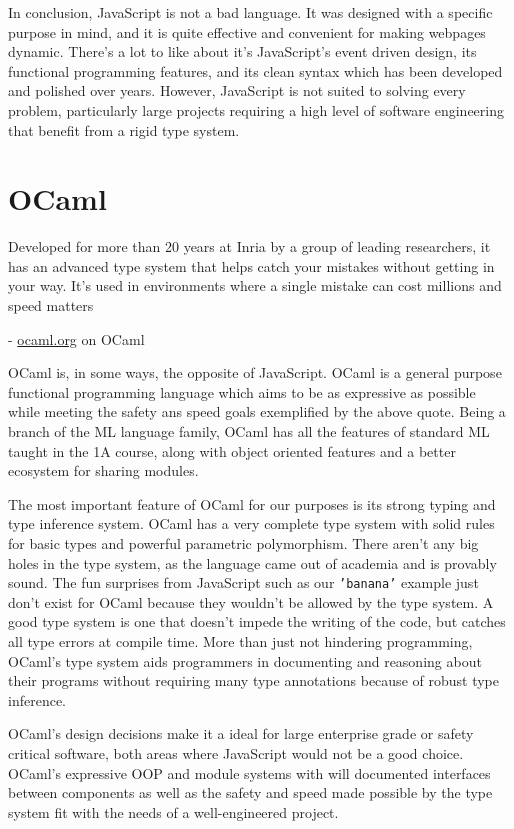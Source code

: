 \documentclass[12pt,a4paper,twoside,openright]{report}
\begin{document}
In conclusion, JavaScript is not a bad language.
It was designed with a specific purpose in mind, and it is quite effective and convenient for making webpages dynamic.
There's a lot to like about it's JavaScript's event driven design, its functional programming features, and its clean syntax which has been developed and polished over years.
However, JavaScript is not suited to solving every problem, particularly large projects requiring a high level of software engineering that benefit from a rigid type system.

\section{OCaml}
\epigraph{Developed for more than 20 years at Inria by a group of leading researchers, it has an advanced type system that helps catch your mistakes without getting in your way. It's used in environments where a single mistake can cost millions and speed matters}{- \url{ocaml.org} on OCaml}

OCaml is, in some ways, the opposite of JavaScript.
OCaml is a general purpose functional programming language which aims to be as expressive as possible while meeting the safety ans speed goals exemplified by the above quote.
Being a branch of the ML language family, OCaml has all the features of standard ML taught in the 1A course, along with object oriented features and a better ecosystem for sharing modules.

The most important feature of OCaml for our purposes is its strong typing and type inference system.
OCaml has a very complete type system with solid rules for basic types and powerful parametric polymorphism.
There aren't any big holes in the type system, as the language came out of academia and is provably sound.
The fun surprises from JavaScript such as our {\tt 'banana'} example just don't exist for OCaml because they wouldn't be allowed by the type system.
A good type system is one that doesn't impede the writing of the code, but catches all type errors at compile time.
More than just not hindering programming, OCaml's type system aids programmers in documenting and reasoning about their programs without requiring many type annotations because of robust type inference.

OCaml's design decisions make it a ideal for large enterprise grade or safety critical software, both areas where JavaScript would not be a good choice.
OCaml's expressive OOP and module systems with will documented interfaces between components as well as the safety and speed made possible by the type system fit with the needs of a well-engineered project.
\end{document}
